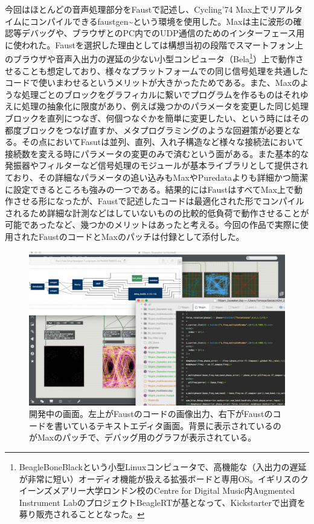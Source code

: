 \documentclass[a4paper,report]{jsbook}
\begin{document}
今回はほとんどの音声処理部分をFaustで記述し、Cycling'74
Max上でリアルタイムにコンパイルできるfaustgen\textasciitilde{}という環境を使用した。Maxは主に波形の確認等デバッグや、ブラウザとのPC内でのUDP通信のためのインターフェース用に使われた。Faustを選択した理由としては構想当初の段階でスマートフォン上のブラウザや音声入出力の遅延の少ない小型コンピュータ（Bela\footnote{BeagleBoneBlackという小型Linuxコンピュータで、高機能な（入出力の遅延が非常に短い）オーディオ機能が扱える拡張ボードと専用OS。イギリスのクイーンズメアリー大学ロンドン校のCentre
  for Digital Music内Augmented Instrument
  LabのプロジェクトBeagleRTが基となって、Kickstarterで出資を募り販売されることとなった\autocite{andrew2015a}。}）上で動作させることも想定しており、様々なプラットフォームでの同じ信号処理を共通したコードで使いまわせるというメリットが大きかったためである。また、Maxのような処理ごとのブロックをグラフィカルに繋いでプログラムを作るものはそれゆえに処理の抽象化に限度があり、例えば幾つかのパラメータを変更した同じ処理ブロックを直列につなぎ、何個つなぐかを簡単に変更したい、という時にはその都度ブロックをつなげ直すか、メタプログラミングのような回避策が必要となる。その点においてFasutは並列、直列、入れ子構造など様々な接続法において接続数を変える時にパラメータの変更のみで済むという面がある。また基本的な発振器やフィルターなど信号処理のモジュールが基本ライブラリとして提供されており、その詳細なパラメータの追い込みもMaxやPuredataよりも詳細かつ簡潔に設定できるところも強みの一つである。\autocites[
]{Orlarey2004faust}{smith2012signal}結果的にはFaustはすべてMax上で動作させる形になったが、Faustで記述したコードは最適化された形でコンパイルされるため詳細な計測などはしていないものの比較的低負荷で動作させることが可能であったなど、幾つかのメリットはあったと考える。今回の作品で実際に使用されたFaustのコードとMaxのパッチは付録として添付した。

\begin{figure}[htbp]
\centering
\includegraphics[width=1.00000\textwidth]{./img/developing.png}
\caption{開発中の画面。左上がFaustのコードの画像出力、右下がFaustのコードを書いているテキストエディタ画面。背景に表示されているのがMaxのパッチで、デバッグ用のグラフが表示されている。\label{fig:developing}}
\end{figure}
\end{document}
